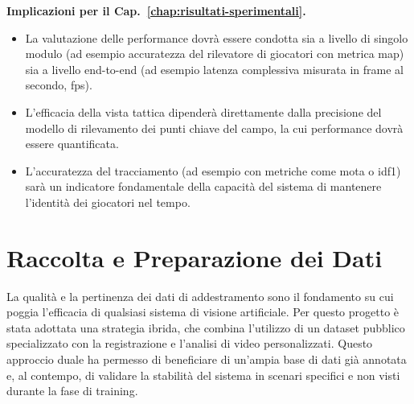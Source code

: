 \documentclass[12pt,a4paper,openright,twoside]{book}
\begin{document}
\textbf{Implicazioni per il Cap.~\ref{chap:risultati-sperimentali}.}
\begin{itemize}
  \item La valutazione delle performance dovrà essere condotta sia a livello di singolo modulo (ad esempio accuratezza del 
  rilevatore di giocatori con metrica \ac{map}) sia a livello end-to-end (ad esempio latenza complessiva misurata in frame al 
  secondo, \ac{fps}).
  \item L'efficacia della vista tattica dipenderà direttamente dalla precisione del modello di rilevamento dei punti 
  chiave del campo, la cui performance dovrà essere quantificata.
  \item L'accuratezza del tracciamento (ad esempio con metriche come \ac{mota} o \ac{idf1}) sarà un indicatore fondamentale della 
  capacità del sistema di mantenere l'identità dei giocatori nel tempo.
\end{itemize}


\section{Raccolta e Preparazione dei Dati}
\label{sec:raccolta-dati}

La qualità e la pertinenza dei dati di addestramento sono il fondamento su cui poggia l'efficacia di qualsiasi sistema 
di visione artificiale. Per questo progetto è stata adottata una strategia ibrida, che combina l'utilizzo di un 
dataset pubblico specializzato con la registrazione e l'analisi di video personalizzati. Questo approccio duale ha 
permesso di beneficiare di un'ampia base di dati già annotata e, al contempo, di validare la stabilità del sistema in 
scenari specifici e non visti durante la fase di training.
\end{document}

